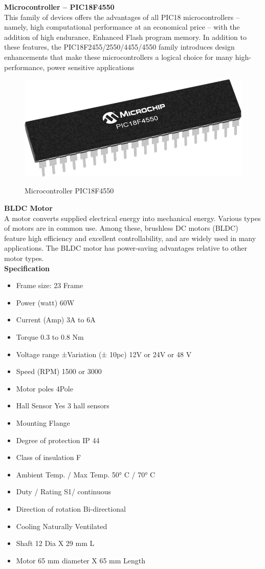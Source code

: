 \documentclass[a4paper,12pt]{article}
\begin{document}
\textbf{Microcontroller – PIC18F4550}\\[1cm]
This family of devices offers the advantages of all
PIC18 microcontrollers – namely, high computational
performance at an economical price – with the addition
of high endurance, Enhanced Flash program memory. In addition to these features, the
PIC18F2455/2550/4455/4550 family introduces design
enhancements that make these microcontrollers a logical choice for many high-performance, power sensitive
applications\\
\begin{figure}[!h]
\centering
\includegraphics[scale=0.3]{uc.jpg}\\
\caption{Microcontroller PIC18F4550}
\end{figure}

\textbf{BLDC Motor}\\[1cm]
A motor converts supplied electrical energy into mechanical energy. Various types of motors are in common use. Among these, brushless DC motors (BLDC) feature high efficiency and excellent controllability, and are widely used in many applications. The BLDC motor has power-saving advantages relative to other motor types.\\
\textbf{Specification}
\begin{itemize}
\item Frame size: 23 Frame
\item Power (watt) 60W
\item Current (Amp) 3A to 6A
\item Torque 0.3 to 0.8 Nm
\item Voltage range ±Variation (± 10pc) 12V or 24V or 48 V
\item Speed (RPM) 1500 or 3000
\item Motor poles 4Pole
\item Hall Sensor Yes 3 hall sensors
\item Mounting Flange
\item Degree of protection IP 44
\item Class of insulation F
\item Ambient Temp. / Max Temp. 50° C / 70° C
\item Duty / Rating S1/ continuous
\item Direction of rotation Bi-directional
\item Cooling Naturally Ventilated
\item Shaft 12 Dia X 29 mm L
\item Motor 65 mm diameter X 65 mm Length
\end{itemize}
\end{document}
